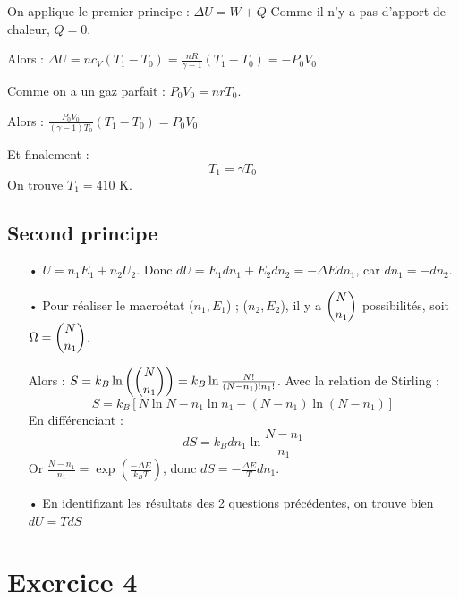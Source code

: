 \documentclass{report}
\begin{document}
On applique le premier principe : $\Delta U = W + Q$
Comme il n'y a pas d'apport de chaleur, $Q=0$. 

Alors : 
$\Delta U = nc_V(T_1-T_0)=\frac{nR}{\gamma-1}(T_1-T_0) = -P_0V_0$

Comme on a un gaz parfait : $P_0V_0=nrT_0$. 

Alors : $\frac{P_0V_0}{(\gamma-1)T_0}(T_1-T_0)=P_0V_0$

Et finalement :
\begin{equation}
T_1=\gamma T_0
\end{equation}
On trouve $T_1=410$ K.


\subsection*{Second principe}

\begin{itemize}
\item[•] $U=n_1E_1+n_2U_2$. Donc $dU=E_1dn_1+E_2dn_2=-\Delta E dn_1$, car $dn_1=-dn_2$.
\item[•] Pour réaliser le macroétat {($n_1, E_1$) ; ($n_2, E_2$)}, il y a $\dbinom{N}{n_1}$ possibilités, soit $\Omega=\dbinom{N}{n_1}$.

Alors : $S=k_B\ln\left( \dbinom{N}{n_1}\right) =k_B\ln\frac{N!}{(N-n_1)!n_1!}$. Avec la relation de Stirling : 
\begin{equation}
S = k_B[N\ln N-n_1\ln n_1 - (N-n_1)\ln (N-n_1)]
\end{equation}
En différenciant :
\begin{equation}
dS=k_Bdn_1\ln\frac{N-n_1}{n_1}
\end{equation}
Or $\frac{N-n_1}{n_1}=\exp(\frac{-\Delta E}{k_BT})$, donc $dS=-\frac{\Delta E}{T}dn_1$.

\item[•] En identifizant les résultats des 2 questions précédentes, on trouve bien $dU=TdS$
\end{itemize}

\section*{Exercice 4}
\end{document}
